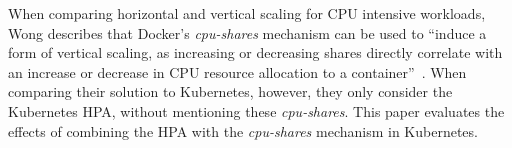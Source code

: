 When comparing horizontal and vertical scaling for CPU intensive workloads, Wong describes that Docker's \textit{cpu-shares} mechanism can be used to ``induce a form of vertical scaling, as increasing or decreasing shares directly correlate with an increase or decrease in CPU resource allocation to a container''~\citep{hyscale}. When comparing their solution to Kubernetes, however, they only consider the Kubernetes HPA, without mentioning these \textit{cpu-shares}. This paper evaluates the effects of combining the HPA with the \textit{cpu-shares} mechanism in Kubernetes. 
